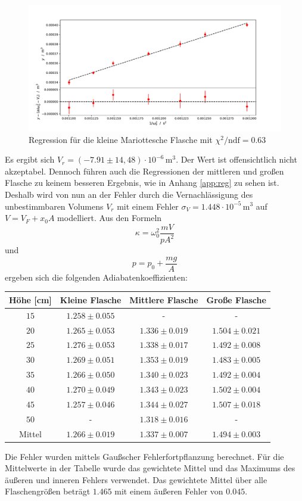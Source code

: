 \documentclass[a4paper, 12pt]{scrartcl}
\begin{document}
\begin{figure}[H]
\centering
\includegraphics[width=\textwidth]{plots/regression_kleine.pdf}
\caption{Regression für die kleine Mariottesche Flasche mit $\chi^2/\text{ndf} = 0.63$}
\label{plt:reg_kle}
\end{figure}
Es ergibt sich $V_r = (-7.91 \pm 14,48) \cdot 10^{-6}\,\text{m}^3$. Der Wert ist offensichtlich nicht akzeptabel. Dennoch führen auch die Regressionen der mittleren und großen Flasche zu keinem besseren Ergebnis, wie in Anhang \ref{app:reg} zu sehen ist. Deshalb wird von nun an der Fehler durch die Vernachlässigung des unbestimmbaren Volumens $V_r$ mit einem Fehler $\sigma_V = 1.448 \cdot 10^{-5}\,\text{m}^3$ auf $V = V_{F} + x_0A$ modelliert.
Aus den Formeln
\begin{equation*}
\kappa = \omega_0^2 \frac{mV}{pA^2}
\end{equation*}
und 
\begin{equation*}
p = p_0 + \frac{mg}{A}
\end{equation*}
ergeben sich die folgenden Adiabatenkoeffizienten:
\begin{table}[H]
\centering
\begin{tabular}{c|ccc}
Höhe [cm] & Kleine Flasche & Mittlere Flasche & Große Flasche \\
\hline
$15$ & $1.258\pm 0.055$ & - & - \\
$20$ & $1.265\pm 0.053$ & $1.336\pm 0.019$ & $1.504\pm 0.021$ \\
$25$ & $1.276\pm 0.053$ & $1.338\pm 0.017$ & $1.492\pm 0.008$ \\
$30$ & $1.269\pm 0.051$ & $1.353\pm 0.019$ & $1.483\pm 0.005$ \\
$35$ & $1.266\pm 0.050$ & $1.340\pm 0.023$ & $1.492\pm 0.004$ \\
$40$ & $1.270\pm 0.049$ & $1.343\pm 0.023$ & $1.502\pm 0.004$ \\
$45$ & $1.257\pm 0.046$ & $1.344\pm 0.027$ & $1.507\pm 0.018$ \\
$50$ & - & $1.318\pm 0.016$ & - \\
\hline
Mittel & $1.266\pm 0.019$ & $1.337\pm 0.007$ & $1.494\pm 0.003$
\end{tabular}
\end{table}	
Die Fehler wurden mittels Gaußscher Fehlerfortpflanzung berechnet. Für die Mittelwerte in der Tabelle wurde das gewichtete Mittel und das Maximums des äußeren und inneren Fehlers verwendet.
Das gewichtete Mittel über alle Flaschengrößen beträgt $1.465$ mit einem äußeren Fehler von $0.045$.
\end{document}
